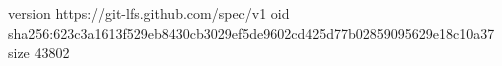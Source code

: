 version https://git-lfs.github.com/spec/v1
oid sha256:623c3a1613f529eb8430cb3029ef5de9602cd425d77b02859095629e18c10a37
size 43802
